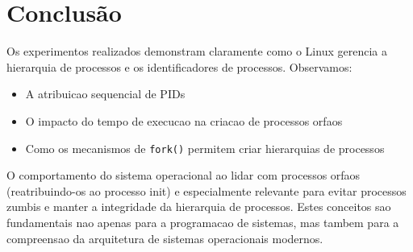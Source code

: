 \documentclass[12pt]{article}
\begin{document}
\section{Conclusão}

Os experimentos realizados demonstram claramente como o Linux gerencia a hierarquia de processos e os identificadores de processos. Observamos:

\begin{itemize}
    \item A atribuicao sequencial de PIDs
    \item O impacto do tempo de execucao na criacao de processos orfaos
    \item Como os mecanismos de \texttt{fork()} permitem criar hierarquias de processos
\end{itemize}

O comportamento do sistema operacional ao lidar com processos orfaos (reatribuindo-os ao processo init) e especialmente relevante para evitar processos zumbis e manter a integridade da hierarquia de processos. Estes conceitos sao fundamentais nao apenas para a programacao de sistemas, mas tambem para a compreensao da arquitetura de sistemas operacionais modernos.
\end{document}
